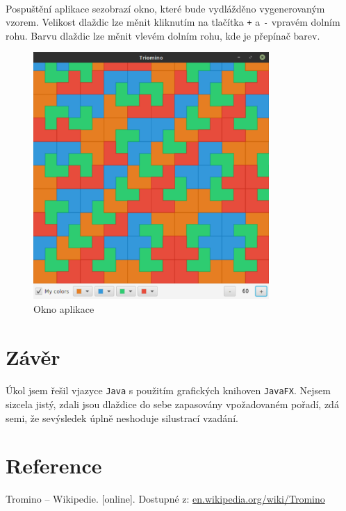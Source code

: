 \documentclass[12pt]{scrartcl}
\begin{document}
\paragraph{}
Po\nobreakspace spuštění aplikace se\nobreakspace zobrazí okno, které bude vydlážděno vygenerovaným vzorem. Velikost dlaždic lze měnit kliknutím na tlačítka \texttt{+} a \texttt{-} v\nobreakspace pravém dolním rohu. Barvu dlaždic lze měnit v\nobreakspace levém dolním rohu, kde je přepínač barev.	

\begin{figure}[!ht]
	\centering
	\label{obr:polekolizi}
	\includegraphics[width=0.8\textwidth,natwidth=1,natheight=1]{app_gui.pdf}
	\caption{Okno aplikace}
\end{figure}

\newpage
\section{Závěr}
\paragraph{}
Úkol jsem řešil v\nobreakspace jazyce \texttt{Java} s použitím grafických knihoven \texttt{JavaFX}.
Nejsem si\nobreakspace zcela jistý, zdali jsou dlaždice do sebe zapasovány v\nobreakspace požadovaném pořadí, zdá se\nobreakspace mi, že se\nobreakspace výsledek úplně neshoduje s\nobreakspace ilustrací v\nobreakspace zadání.

\section{Reference}

Tromino – Wikipedie. [online]. Dostupné z: \href{https://en.wikipedia.org/wiki/Tromino}{en.wikipedia.org/wiki/Tromino}
\end{document}
